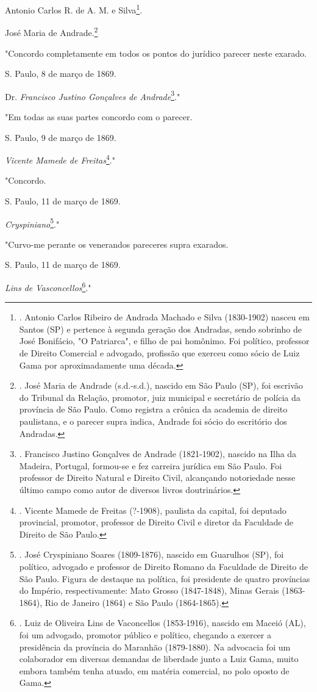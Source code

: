 Antonio Carlos R. de A. M. e Silva\footnote{. Antonio Carlos Ribeiro de
  Andrada Machado e Silva (1830-1902) nasceu em Santos (SP) e pertence à
  segunda geração dos Andradas, sendo sobrinho de José Bonifácio, "O
  Patriarca", e filho de pai homônimo. Foi político, professor de
  Direito Comercial e advogado, profissão que exerceu como sócio de Luiz
  Gama por aproximadamente uma década.}.

José Maria de Andrade.\footnote{. José Maria de Andrade (s.d.-s.d.),
  nascido em São Paulo (SP), foi escrivão do Tribunal da Relação,
  promotor, juiz municipal e secretário de polícia da província de São
  Paulo. Como registra a crônica da academia de direito paulistana, e o
  parecer supra indica, Andrade foi sócio do escritório dos Andradas.}

"Concordo completamente em todos os pontos do jurídico parecer neste
exarado.

S. Paulo, 8 de março de 1869.

Dr. \emph{Francisco Justino Gonçalves de Andrade}\footnote{. Francisco
  Justino Gonçalves de Andrade (1821-1902), nascido na Ilha da Madeira,
  Portugal, formou-se e fez carreira jurídica em São Paulo. Foi
  professor de Direito Natural e Direito Civil, alcançando notoriedade
  nesse último campo como autor de diversos livros doutrinários.}."

"Em todas as suas partes concordo com o parecer.

S. Paulo, 9 de março de 1869.

\emph{Vicente Mamede de Freitas}\footnote{. Vicente Mamede de Freitas
  (?-1908), paulista da capital, foi deputado provincial, promotor,
  professor de Direito Civil e diretor da Faculdade de Direito de São
  Paulo.}."

"Concordo.

S. Paulo, 11 de março de 1869.

\emph{Cryspiniano}\footnote{. José Cryspiniano Soares (1809-1876),
  nascido em Guarulhos (SP), foi político, advogado e professor de
  Direito Romano da Faculdade de Direito de São Paulo. Figura de
  destaque na política, foi presidente de quatro províncias do Império,
  respectivamente: Mato Grosso (1847-1848), Minas Gerais (1863-1864),
  Rio de Janeiro (1864) e São Paulo (1864-1865).}."

"Curvo-me perante os venerandos pareceres supra exarados.

S. Paulo, 11 de março de 1869.

\emph{Lins de Vasconcellos}\footnote{. Luiz de Oliveira Lins de
  Vaconcellos (1853-1916), nascido em Maceió (AL), foi um advogado,
  promotor público e político, chegando a exercer a presidência da
  província do Maranhão (1879-1880). Na advocacia foi um colaborador em
  diversas demandas de liberdade junto a Luiz Gama, muito embora também
  tenha atuado, em matéria comercial, no polo oposto de Gama.}."


